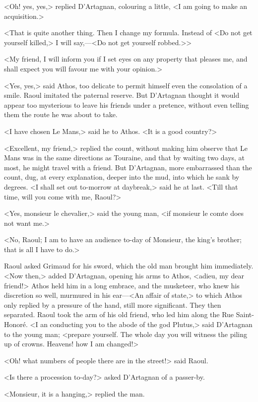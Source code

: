 <Oh! yes, yes,> replied D'Artagnan, colouring a little, <I am going to make an acquisition.>

<That is quite another thing. Then I change my formula. Instead of <Do not get yourself killed,> I will say,—<Do not get yourself robbed.>>

<My friend, I will inform you if I set eyes on any property that pleases me, and shall expect you will favour me with your opinion.>

<Yes, yes,> said Athos, too delicate to permit himself even the consolation of a smile. Raoul imitated the paternal reserve. But D'Artagnan thought it would appear too mysterious to leave his friends under a pretence, without even telling them the route he was about to take.

<I have chosen Le Mans,> said he to Athos. <It is a good country?>

<Excellent, my friend,> replied the count, without making him observe that Le Mans was in the same directions as Touraine, and that by waiting two days, at most, he might travel with a friend. But D'Artagnan, more embarrassed than the count, dug, at every explanation, deeper into the mud, into which he sank by degrees. <I shall set out to-morrow at daybreak,> said he at last. <Till that time, will you come with me, Raoul?>

<Yes, monsieur le chevalier,> said the young man, <if monsieur le comte does not want me.>

<No, Raoul; I am to have an audience to-day of Monsieur, the king's brother; that is all I have to do.>

Raoul asked Grimaud for his sword, which the old man brought him immediately. <Now then,> added D'Artagnan, opening his arms to Athos, <adieu, my dear friend!> Athos held him in a long embrace, and the musketeer, who knew his discretion so well, murmured in his ear—<An affair of state,> to which Athos only replied by a pressure of the hand, still more significant. They then separated. Raoul took the arm of his old friend, who led him along the Rue Saint-Honoré. <I an conducting you to the abode of the god Plutus,> said D'Artagnan to the young man; <prepare yourself. The whole day you will witness the piling up of crowns. Heavens! how I am changed!>

<Oh! what numbers of people there are in the street!> said Raoul.

<Is there a procession to-day?> asked D'Artagnan of a passer-by.

<Monsieur, it is a hanging,> replied the man.

